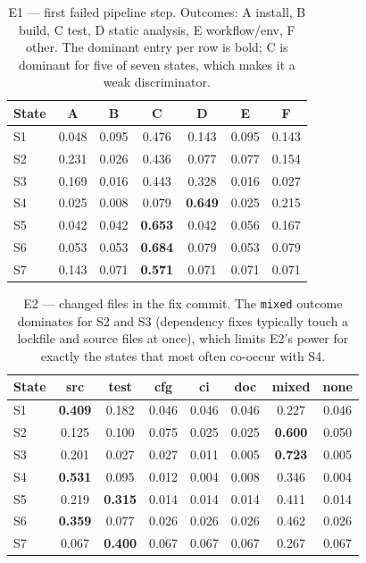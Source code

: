 \documentclass{article}
\begin{document}
\begin{table}[h]
\centering
\small
\setlength{\tabcolsep}{4pt}
\begin{tabular}{lcccccc}
\toprule
State & A & B & C & D & E & F \\
\midrule
S1 & 0.048 & 0.095 & 0.476 & 0.143 & 0.095 & 0.143 \\
S2 & 0.231 & 0.026 & 0.436 & 0.077 & 0.077 & 0.154 \\
S3 & 0.169 & 0.016 & 0.443 & 0.328 & 0.016 & 0.027 \\
S4 & 0.025 & 0.008 & 0.079 & \textbf{0.649} & 0.025 & 0.215 \\
S5 & 0.042 & 0.042 & \textbf{0.653} & 0.042 & 0.056 & 0.167 \\
S6 & 0.053 & 0.053 & \textbf{0.684} & 0.079 & 0.053 & 0.079 \\
S7 & 0.143 & 0.071 & \textbf{0.571} & 0.071 & 0.071 & 0.071 \\
\bottomrule
\end{tabular}
\caption{E1 --- first failed pipeline step. Outcomes: A install, B build, C test, D static analysis, E workflow/env, F other. The dominant entry per row is bold; C is dominant for five of seven states, which makes it a weak discriminator.}
\label{tab:e1}
\end{table}

\begin{table}[h]
\centering
\small
\setlength{\tabcolsep}{3.5pt}
\begin{tabular}{lccccccc}
\toprule
State & src & test & cfg & ci & doc & mixed & none \\
\midrule
S1 & \textbf{0.409} & 0.182 & 0.046 & 0.046 & 0.046 & 0.227 & 0.046 \\
S2 & 0.125 & 0.100 & 0.075 & 0.025 & 0.025 & \textbf{0.600} & 0.050 \\
S3 & 0.201 & 0.027 & 0.027 & 0.011 & 0.005 & \textbf{0.723} & 0.005 \\
S4 & \textbf{0.531} & 0.095 & 0.012 & 0.004 & 0.008 & 0.346 & 0.004 \\
S5 & 0.219 & \textbf{0.315} & 0.014 & 0.014 & 0.014 & 0.411 & 0.014 \\
S6 & \textbf{0.359} & 0.077 & 0.026 & 0.026 & 0.026 & 0.462 & 0.026 \\
S7 & 0.067 & \textbf{0.400} & 0.067 & 0.067 & 0.067 & 0.267 & 0.067 \\
\bottomrule
\end{tabular}
\caption{E2 --- changed files in the fix commit. The \texttt{mixed} outcome dominates for S2 and S3 (dependency fixes typically touch a lockfile and source files at once), which limits E2's power for exactly the states that most often co-occur with S4.}
\label{tab:e2}
\end{table}
\end{document}
